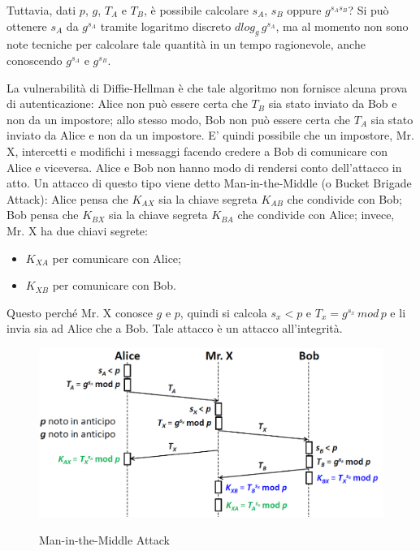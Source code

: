 Tuttavia, dati $p$, $g$, $T_{A}$ e $T_{B}$, è possibile calcolare $s_{A}$, $s_{B}$ oppure $g^{s_{A}s_{B}}$? Si può ottenere $s_{A}$ da $g^{s_{A}}$ tramite logaritmo discreto $dlog_{g} \, g^{s_{A}}$, ma al momento non sono note tecniche per calcolare tale quantità in un tempo ragionevole, anche conoscendo $g^{s_{A}}$ e $g^{s_{B}}$.

La vulnerabilità di Diffie-Hellman è che tale algoritmo non fornisce alcuna prova di autenticazione: Alice non può essere certa che $T_{B}$ sia stato inviato da Bob e non da un impostore; allo stesso modo, Bob non può essere certa che $T_{A}$ sia stato inviato da Alice e non da
un impostore. E' quindi possibile che un impostore, Mr. X, intercetti e modifichi i messaggi facendo credere a Bob di comunicare con Alice e
viceversa. Alice e Bob non hanno modo di rendersi conto dell'attacco in atto. Un attacco di questo tipo viene detto Man-in-the-Middle (o Bucket Brigade Attack): Alice pensa che $K_{AX}$ sia la chiave segreta $K_{AB}$ che condivide con Bob; Bob pensa che $K_{BX}$ sia la chiave segreta $K_{BA}$ che condivide con Alice; invece, Mr. X ha due chiavi segrete: \begin{itemize}
\item $K_{XA}$ per comunicare con Alice;
\item $K_{XB}$ per comunicare con Bob.
\end{itemize}
Questo perché Mr. X conosce $g$ e $p$, quindi si calcola $s_{x}<p$ e $T_{x}=g^{s_{x}} \, mod \, p$ e li invia sia ad Alice che a Bob. Tale attacco è un attacco all'integrità.
\begin{figure}[htbp]
	\centering%
	\subfigure%
	{\includegraphics[scale=0.5, keepaspectratio]{Immagini/chiave_pubblica/DiffieHellman_maninthemiddle.png}}
	\caption{Man-in-the-Middle Attack}
\end{figure}


